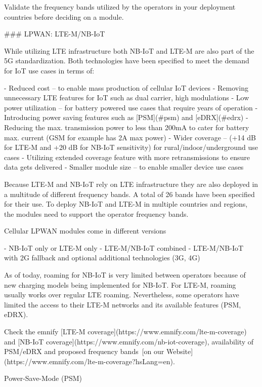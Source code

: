 \documentclass[11pt, oneside]{article}   	%
\newcommand{\addspace}{\vspace{2mm}}
\begin{document}
\begin{tcolorbox}[colback=green!5!white,colframe=green!75!black,title=Tip]
Validate the frequency bands utilized by the operators in your deployment countries before deciding on a module.
\end{tcolorbox}
\begin{markdown}

### LPWAN: LTE-M/NB-IoT

While utilizing LTE infrastructure both NB-IoT and LTE-M are also part of the 5G standardization.
Both technologies have been specified to meet the demand for IoT use cases in terms of:
\end{markdown}
\addspace
\begin{markdown}
- Reduced cost -- to enable mass production of cellular IoT devices
    - Removing unnecessary LTE features for IoT such as dual carrier, high modulations
- Low power utilization -- for battery powered use cases that require years of operation
    - Introducing power saving features such as [PSM](#psm) and [eDRX](#edrx)
    - Reducing the max. transmission power to less than 200mA to cater for battery max. current (GSM for example has 2A max power) 
- Wider coverage -- (+14 dB for LTE-M and +20 dB for NB-IoT sensitivity) for rural/indoor/underground use cases
    - Utilizing extended coverage feature with more retransmissions to ensure data gets delivered 
- Smaller module size -- to enable smaller device use cases
\end{markdown}
\addspace
\begin{markdown}
Because LTE-M and NB-IoT rely on LTE infrastructure they are also deployed in a multitude of different frequency bands.
A total of 26 bands have been specified for their use.
To deploy NB-IoT and LTE-M in multiple countries and regions, the modules need to support the operator frequency bands.

Cellular LPWAN modules come in different versions

- NB-IoT only or LTE-M only
- LTE-M/NB-IoT combined
- LTE-M/NB-IoT with 2G fallback and optional additional technologies (3G, 4G)

As of today, roaming for NB-IoT is very limited between operators because of new charging models being implemented for NB-IoT.
For LTE-M, roaming usually works over regular LTE roaming.
Nevertheless, some operators have limited the access to their LTE-M networks and its available features (PSM, eDRX).

Check the emnify [LTE-M coverage](https://www.emnify.com/lte-m-coverage) and [NB-IoT coverage](https://www.emnify.com/nb-iot-coverage), availability of PSM/eDRX and proposed frequency bands [on our Website](https://www.emnify.com/lte-m-coverage?hsLang=en).

Power-Save-Mode (PSM)
\end{markdown}
\end{document}
